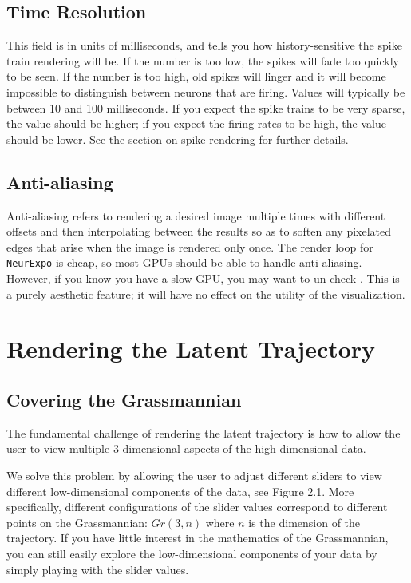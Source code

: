 \documentclass[12pt, openany]{book}
\begin{document}
\section{Time Resolution}

This field is in units of milliseconds, and tells you how history-sensitive the spike train rendering will be. If the number is too low, the spikes will fade too quickly to be seen. If the number is too high, old spikes will linger and it will become impossible to distinguish between neurons that are firing. Values will typically be between 10 and 100 milliseconds. If you expect the spike trains to be very sparse, the value should be higher; if you expect the firing rates to be high, the value should be lower. See the section on spike rendering for further details.

\section{Anti-aliasing}

Anti-aliasing refers to rendering a desired image multiple times with different offsets and then interpolating between the results so as to soften any pixelated edges that arise when the image is rendered only once. The render loop for \texttt{NeurExpo} is cheap, so most GPUs should be able to handle anti-aliasing. However, if you know you have a slow GPU, you may want to un-check . This is a purely aesthetic feature; it will have no effect on the utility of the visualization.

\chapter{Rendering the Latent Trajectory}

\section{Covering the Grassmannian}

The fundamental challenge of rendering the latent trajectory is how to allow the user to view multiple 3-dimensional aspects of the high-dimensional data.

We solve this problem by allowing the user to adjust different sliders to view different low-dimensional components of the data, see Figure 2.1. More specifically, different configurations of the slider values correspond to different points on the Grassmannian: $Gr(3,n)$ where $n$ is the dimension of the trajectory. If you have little interest in the mathematics of the Grassmannian, you can still easily explore the low-dimensional components of your data by simply playing with the slider values.
\end{document}
